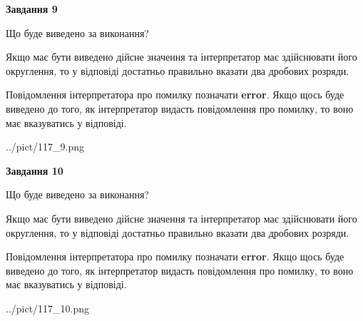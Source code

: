 \documentclass[12pt, ukrainian]{article}
\begin{document}
{\begin {Large}
{\begin {center}\textbf{Завдання 9}\end {center}}\par
Що буде виведено за виконання? \par

Якщо має бути виведено дійсне значення та інтерпретатор має здійснювати його округлення, 
то у відповіді достатньо правильно вказати два дробових розряди.

Повідомлення інтерпретатора про помилку позначати \textbf{error}.
Якщо щось буде виведено до того, як інтерпретатор видасть повідомлення про помилку, 
то воно має вказуватись у відповіді. \par

\begin{center}
	{../pict/117_9.png}
\end{center}
\newpage

{\begin {center}\textbf{Завдання 10}\end {center}}\par
Що буде виведено за виконання? \par

Якщо має бути виведено дійсне значення та інтерпретатор має здійснювати його округлення, 
то у відповіді достатньо правильно вказати два дробових розряди.

Повідомлення інтерпретатора про помилку позначати \textbf{error}.
Якщо щось буде виведено до того, як інтерпретатор видасть повідомлення про помилку, 
то воно має вказуватись у відповіді. \par

\begin{center}
	{../pict/117_10.png}
\end{center}
\newpage

\end {Large}}
\end{document}
